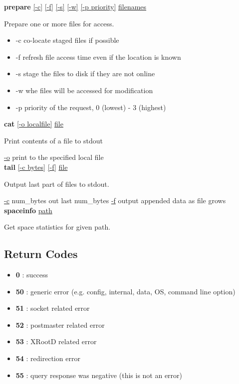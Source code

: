 \documentclass{article}
\begin{document}
        \noindent \textbf{prepare} \underline{[-c]} \underline{[-f]} \underline{[-s]} \underline{[-w]} \underline{[-p priority]} \underline{filenames}
        
        \noindent Prepare one or more files for access.
        \begin{itemize}
           \item -c co-locate staged files if possible
           \item -f refresh file access time even if the location is known
           \item -s stage the files to disk if they are not online
           \item -w whe files will be accessed for modification
           \item -p priority of the request, 0 (lowest) - 3 (highest)
        \end{itemize}

        \noindent \textbf{cat} \underline{[-o localfile]} \underline{file}
        
        \noindent Print contents of a file to stdout
        
        \underline{-o} print to the specified local file \\

        \noindent \textbf{tail} \underline{[-c bytes]} \underline{[-f]} \underline{file}
        
        \noindent Output last part of files to stdout.
        
        \underline{-c} num_bytes out last num_bytes
        \underline{-f} output appended data as file grows \\

        \noindent \textbf{spaceinfo} \underline{path}
        
        \noindent Get space statistics for given path.

	\subsection{Return Codes}
		\begin{itemize}
		  	\item \textbf{0}  : success 
  			\item \textbf{50} : generic error (e.g. config, internal, data, OS, command line option)
  			\item \textbf{51} : socket related error
			\item \textbf{52} : postmaster related error
			\item \textbf{53} : XRootD related error
			\item \textbf{54} : redirection error
			\item \textbf{55} : query response was negative (this is not an error)
		\end{itemize}
\end{document}
